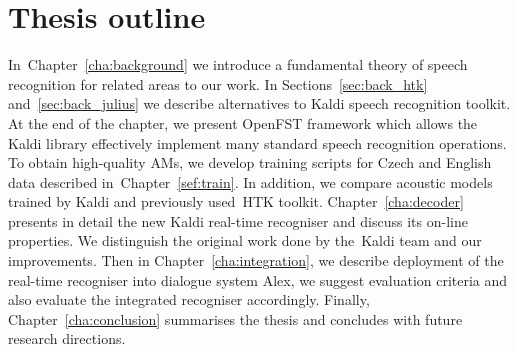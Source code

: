 \section*{Thesis outline} 
In~Chapter~\ref{cha:background} we introduce a fundamental theory of speech recognition for related areas to our work.
In Sections~\ref{sec:back_htk} and~\ref{sec:back_julius} we describe alternatives to Kaldi speech recognition toolkit. 
At the end of the chapter, we present OpenFST framework which allows the Kaldi library effectively implement many standard speech recognition operations. 
To obtain high-quality \aclp{AM}, we develop training scripts for Czech and English data described in~Chapter~\ref{sef:train}. 
In addition, we compare acoustic models trained by Kaldi and previously used~\ac{HTK} toolkit. 
Chapter~\ref{cha:decoder} presents in detail the new Kaldi real-time recogniser and discuss its on-line properties.
We distinguish the original work done by the~Kaldi team and our improvements. 
Then in Chapter~\ref{cha:integration}, we describe deployment of the real-time recogniser into dialogue system Alex, we suggest evaluation criteria and also evaluate the integrated recogniser accordingly.
Finally, Chapter~\ref{cha:conclusion} summarises the thesis and concludes with future research directions.
